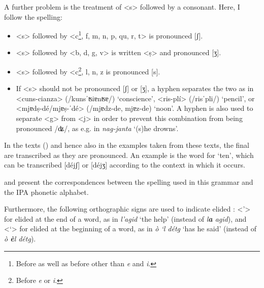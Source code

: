 A further problem is the treatment of <s> followed by a consonant. Here, I follow the  spelling:

\begin{itemize}
	
	\item <s> followed by <c\footnote{Before  as well as before  other than \textit{e} and \textit{i}.}, f, m, n, p, qu, r, t> is pronounced [ʃ].
	\item <s> followed by <b, d, g, v> is written <ṣ> and pronounced [ʒ].
	\item <s> followed by <c\footnote{Before \textit{e} or \textit{i}.}, l, n, z is pronounced [s].
	\item If <s> should not be pronounced [ʃ] or [ʒ], a hyphen separates the two  as in <cuns-cianza> (/kunsˈʦiɐnʦɐ/) `conscience', <ris-plí> (/risˈpli/) `pencil', or <mjɐdṣ-dé/mjɐṣ-ˈdé> (/mjɐdz-de, mjɐz-de) `noon'. A hyphen is also used to separate <g> from <j> in order to prevent this combination from being pronounced /ʥ/, as e.g. in \textit{nag-janta} `(s)he drowns'.
\end{itemize}

In the texts () and hence also in the examples taken from these texts, the final  are transcribed as they are pronounced. An example is the word for `ten', which can be transcribed [déjʃ] or [déjʒ] according to the context in which it occurs.

 and  present the correspondences between the spelling used in this grammar and the IPA phonetic alphabet.




Furthermore, the following orthographic signs are used to indicate elided : <'> for  elided at the end of a word, as in \textit{l'agid} `the help' (instead of \textit{l\textbf{a} agid}), and <`> for  elided at the beginning of a word, as in \textit{ò `l détg} `has he said' (instead of \textit{ò \textbf{è}l détg}).

